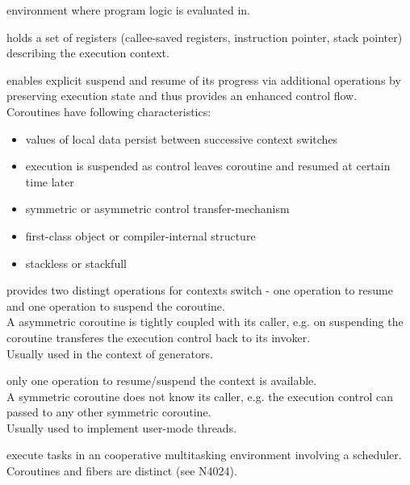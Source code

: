 
environment where program logic is evaluated in.

holds a set of registers (callee-saved registers, instruction pointer, stack
pointer) describing the execution context.

enables explicit suspend and resume of its progress via additional operations by
preserving execution state and thus provides an enhanced control flow.\\
Coroutines have following characteristics\cite{N3985}:
\begin{itemize}
    \item values of local data persist between successive context switches
    \item execution is suspended as control leaves coroutine and resumed at
          certain time later
    \item symmetric or asymmetric control transfer-mechanism
    \item first-class object or compiler-internal structure
    \item stackless or stackfull
\end{itemize}

provides two distingt operations for contexts switch - one operation to
resume and one operation to suspend the coroutine.\\
A asymmetric coroutine is tightly coupled with its caller, e.g. on suspending
the coroutine transferes the execution control back to its invoker.\\
Usually used in the context of generators.

only one operation to resume/suspend the context is available.\\
A symmetric coroutine does not know its caller, e.g. the execution control can
passed to any other symmetric coroutine.\\
Usually used to implement user-mode threads.

execute tasks in an cooperative multitasking environment involving a
scheduler. Coroutines and fibers are distinct (see N4024\cite{N4024}).

